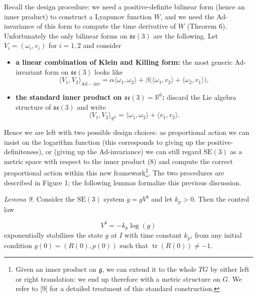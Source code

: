 \documentclass[10pt,twocolumn]{article}
\newcommand{\SE}{\mathrm{SE}}
\newcommand{\se}{\mathfrak{se}}
\newcommand{\gfrak}{\mathfrak g}
\newcommand{\tr}{\operatorname{tr}}
\newcommand{\R}{\mathbb R}
\newcommand{\paperhead}[2]{\par\medskip\noindent\textit{#1} #2\par}
\begin{document}
Recall the design procedure: we need a positive-definite bilinear form (hence an inner product) to construct a Lyapunov function $W$, and we need the Ad-invariance of this form to compute the time derivative of $W$ (Theorem 6). Unfortunately the only bilinear forms on $\se(3)$ are the following. Let $V_i=(\omega_i,v_i)$ for $i=1,2$ and consider
\begin{itemize}[leftmargin=1.4em,label=$\square$,itemsep=0.25em,topsep=0.25em]
\item \textbf{a linear combination of Klein and Killing form:} the most generic Ad-invariant form on $\se(3)$ looks like
\begin{equation*}
\langle V_1,V_2\rangle_{\mathrm{Ad-inv}}
=\alpha\langle\omega_1,\omega_2\rangle
+\beta\bigl(\langle\omega_1,v_2\rangle+\langle\omega_2,v_1\rangle\bigr),
\end{equation*}
\item \textbf{the standard inner product on $\se(3)=\R^6$:} discard the Lie algebra structure of $\se(3)$ and write
\begin{equation*}
\langle V_1,V_2\rangle_{\R^6}
=\langle\omega_1,\omega_2\rangle+\langle v_1,v_2\rangle.\tag{8}
\end{equation*}
\end{itemize}
Hence we are left with two possible design choices: as proportional action we can insist on the logarithm function (this corresponds to giving up the positive-definiteness), or (giving up the Ad-invariance) we can still regard $\SE(3)$ as a metric space with respect to the inner product (8) and compute the correct proportional action within this new framework\footnote{Given an inner product on $\gfrak$, we can extend it to the whole $TG$ by either left or right translation: we end up therefore with a metric structure on $G$. We refer to [9] for a detailed treatment of this standard construction.}. The two procedures are described in Figure 1; the following lemmas formalize this previous discussion.

\paperhead{Lemma 9.}{Consider the $\SE(3)$ system $\dot g=gV^b$ and let $k_p>0$. Then the control law}
\begin{equation*}
V^b=-k_p\log(g)\tag{9}
\end{equation*}
exponentially stabilizes the state $g$ at $I$ with time constant $k_p$, from any initial condition $g(0)=(R(0),p(0))$ such that $\tr(R(0))\neq-1$.
\end{document}
